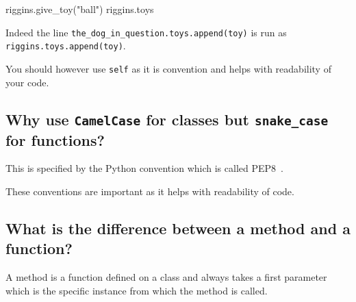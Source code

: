 \begin{raw}
[]
\end{raw}







\begin{pyin}
riggins.give_toy("ball")
riggins.toys
\end{pyin}





\begin{raw}
['ball']
\end{raw}





Indeed the line \texttt{the\_dog\_in\_question.toys.append(toy)} is run as
\texttt{riggins.toys.append(toy)}.


You should however use \texttt{self} as it is convention and helps with readability of
your code.


\subsection{Why use \texttt{CamelCase} for classes but \texttt{snake\_case} for functions?}

This is specified by the Python convention which is called PEP8~\cite{pep8}.


These conventions are important as it helps with readability of code.

\subsection{What is the difference between a method and a function?}

A method is a function defined on a class and always takes a first parameter
which is the specific instance from which the method is called.
